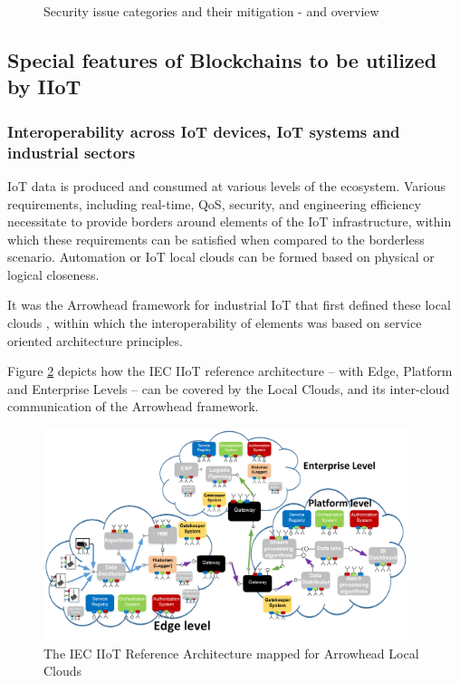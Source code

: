 \documentclass[a4paper]{article}
\begin{document}
\begin{figure}[H]
\begin{minipage}{0.48\textwidth}
     \caption{Security issue categories and their mitigation - and overview \cite{IoT_Security}}
     \label{fig:IoT_Table}
    \end{minipage}\hfill
\end{figure}

\subsection{Special features of Blockchains to be utilized by IIoT}

\subsubsection{Interoperability across IoT devices, IoT systems and industrial sectors}

IoT data is produced and consumed at various levels of the ecosystem. Various requirements, including real-time, QoS, security, and engineering efficiency necessitate to provide borders around elements of the IoT infrastructure, within which these requirements can be satisfied when compared to the borderless scenario. Automation or IoT local clouds can be formed based on physical or logical closeness. 

It was the Arrowhead framework for industrial IoT that first defined these local clouds \cite{Arrowhead_Interoperability}, within which the interoperability of elements was based on service oriented architecture principles.

Figure \ref{fig:IIoT_intercloud} depicts how the IEC IIoT reference architecture -- with Edge, Platform and Enterprise Levels -- can be covered by the Local Clouds, and its inter-cloud communication of the Arrowhead framework.

\begin{figure}[H]
    \centering
    \includegraphics[width=0.95\textwidth]{figures/Arrowhead-IIoT.png}
    \caption{The IEC IIoT Reference Architecture mapped for Arrowhead Local Clouds \cite{IIoT_intercloud}}
    \label{fig:IIoT_intercloud}
\end{figure}
\end{document}
